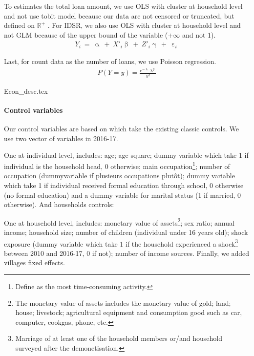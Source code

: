 \documentclass[a4paper, 11pt, onecolumn]{article}
\begin{document}
To estimates the total loan amount, we use OLS with cluster at household level and not use tobit model because our data are not censored or truncated, but defined on $\mathbb{R}^{+}$ \citep{Maddala1991}.
For IDSR, we also use OLS with cluster at household level and not GLM because of the upper bound of the variable ($+\infty$ and not 1).
\begin{equation}\label{eq:ols}
\begin{split}
Y_{i}~=~\upalpha~+~X'_i\upbeta~+~Z'_{i}\upgamma~+~\upepsilon_i
\end{split}
\end{equation}


Last, for count data as the number of loans, we use Poisson regression.
\begin{equation}\label{eq:poisson}
\begin{split}
P(Y=y)=\frac{e^{-\uplambda}\uplambda^{y}}{y!}
\end{split}
\end{equation}







{Econ_desc.tex}



\paragraph{Control variables}
Our control variables are based on \cite{Reboul2021, Brown2014, Chichaibelu2017} which take the existing classic controls. 
We use two vector of variables in 2016-17.

One at individual level, includes: age; age square; dummy variable which take 1 if individual is the household head, 0 otherwise; main occupation\footnote{Define as the most time-consuming activity.}; number of occupation (dummyvariable if plusieurs occupations plutôt); dummy variable which take 1 if individual received formal education through school, 0 otherwise (no formal education) and a dummy variable for marital status (1 if married, 0 otherwise). 
And households controls: 

One at household level, includes: monetary value of assets\footnote{The monetary value of assets includes the monetary value of gold; land; house; livestock; agricultural equipment and consumption good such as car, computer, cookgas, phone, etc.}; sex ratio; annual income; household size; number of children (individual under 16 years old); shock exposure (dummy variable which take 1 if the household experienced a shock\footnote{Marriage of at least one of the household members or/and household surveyed after the demonetisation.} between 2010 and 2016-17, 0 if not); number of income sources. 
Finally, we added villages fixed effects.
\end{document}
